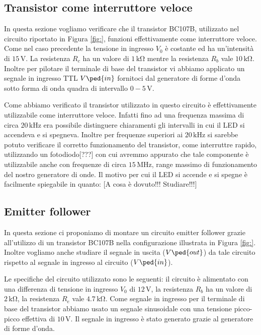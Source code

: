 \subsection*{Transistor come interruttore veloce}

In questa sezione vogliamo verificare che il transistor BC107B, utilizzato nel circuito riportato in Figura \ref{fig:}, funzioni effettivamente come interruttore veloce.
Come nel caso precedente la tensione in ingresso $V_0$ è costante ed ha un'intensità di $15\,\si{\volt}$. La resistenza $R_c$ ha un valore di $1\,\si{\kilo\ohm}$ mentre la resistenza $R_b$ vale $10\,\si{\kilo\ohm}$. Inoltre per pilotare il terminale di base del transistor vi abbiamo applicato un segnale in ingresso TTL $V\ped{in}$ fornitoci dal generatore di forme d'onda sotto forma di onda quadra di intervallo $0-5\,\si{\volt}$.

Come abbiamo verificato il transistor utilizzato in questo circuito è effettivamente utilizzabile come interruttore veloce. Infatti fino ad una frequenza massima di circa $20\,\si{\kilo\hertz}$ era possibile distinguere chiaramenti gli intervalli in cui il LED si accendeva e si spegneva. Inoltre per frequenze superiori ai $20\,\si{\kilo\hertz}$  si sarebbe potuto verificare il corretto funzionamento del transistor, come interruttre rapido, utilizzando un fotodiodo[???] con cui avremmo appurato che tale componente è utilizzabile anche con frequenze di circa $15\,\si{\mega\hertz}$, range massimo di funzionamento del nostro generatore di onde.
Il motivo per cui il LED si accende e si spegne è facilmente spiegabile in quanto: [A cosa è dovuto!!! Studiare!!!]

\subsection*{Emitter follower}

In questa sezione ci proponiamo di montare un circuito emitter follower grazie all'utilizzo di un transistor BC107B nella configurazione illustrata in Figura \ref{fig:}. Inoltre vogliamo anche studiare il segnale in uscita ($V\ped{out}$) da tale circuito rispetto al segnale in ingresso al circuito ($V\ped{in}$).

Le specifiche del circuito utilizzato sono le seguenti: il circuito è alimentato con una differenza di tensione in ingresso $V_0$ di $12\,\si{\volt}$, la resistenza $R_b$ ha un valore di $2\,\si{\kilo\ohm}$, la resistenza $R_e$ vale $4.7\,\si{\kilo\ohm}$. Come segnale in ingresso per il terminale di base del transistor abbiamo usato un segnale sinusoidale con una tensione picco-picco effettiva di $10\,\si{\volt}$. Il segnale in ingresso è stato generato grazie al generatore di forme d'onda.



\subsection*{}

\subsection*{}

